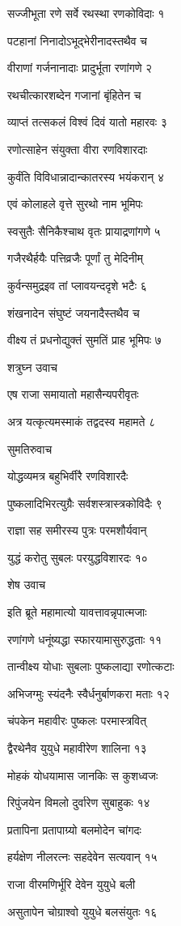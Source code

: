 सज्जीभूता रणे सर्वे रथस्था रणकोविदाः १

पटहानां निनादोऽभूद्भेरीनादस्तथैव च

वीराणां गर्जनानादाः प्रादुर्भूता रणांगणे २

रथचीत्कारशब्देन गजानां बृंहितेन च

व्याप्तं तत्सकलं विश्वं दिवं यातो महारवः ३

रणोत्साहेन संयुक्ता वीरा रणविशारदाः

कुर्वंति विविधान्नादान्कातरस्य भयंकरान् ४

एवं कोलाहले वृत्ते सुरथो नाम भूमिपः

स्वसुतैः सैनिकैश्चाथ वृतः प्रायाद्रणांगणे ५

गजैरथैर्हयैः पत्तिव्रजैः पूर्णां तु मेदिनीम्

कुर्वन्समुद्रइव तां प्लावयन्ददृशे भटैः ६

शंखनादेन संघुष्टं जयनादैस्तथैव च

वीक्ष्य तं प्रधनोद्युक्तं सुमतिं प्राह भूमिपः ७

शत्रुघ्न उवाच

एष राजा समायातो महासैन्यपरीवृतः

अत्र यत्कृत्यमस्माकं तद्वदस्व महामते ८

सुमतिरुवाच

योद्धव्यमत्र बहुभिर्वीरै रणविशारदैः

पुष्कलादिभिरत्युग्रैः सर्वशस्त्रास्त्रकोविदैः ९

राज्ञा सह समीरस्य पुत्रः परमशौर्यवान्

युद्धं करोतु सुबलः परयुद्धविशारदः १०

शेष उवाच

इति ब्रूते महामात्यो यावत्तावन्नृपात्मजाः

रणांगणे धनूंष्यद्धा स्फारयामासुरुद्धताः ११

तान्वीक्ष्य योधाः सुबलाः पुष्कलाद्या रणोत्कटाः

अभिजग्मुः स्यंदनैः स्वैर्धनुर्बाणकरा मताः १२

चंपकेन महावीरः पुष्कलः परमास्त्रवित्

द्वैरथेनैव युयुधे महावीरेण शालिना १३

मोहकं योधयामास जानकिः स कुशध्वजः

रिपुंजयेन विमलो दुर्वारेण सुबाहुकः १४

प्रतापिना प्रतापाग्र्यो बलमोदेन चांगदः

हर्यक्षेण नीलरत्नः सहदेवेन सत्यवान् १५

राजा वीरमणिर्भूरि देवेन युयुधे बली

असुतापेन चोग्राश्वो युयुधे बलसंयुतः १६

